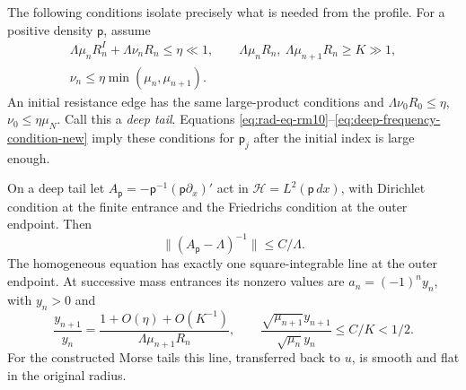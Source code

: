 The following conditions isolate precisely what is needed from the
profile.  For a positive density $\mathsf p$, assume
\begin{equation}\label{eq:rad-eq-dg1}
 \begin{gathered}
 \Lambda\mu_nR_n^I+\Lambda\nu_nR_n\le\eta\ll1,\qquad
 \Lambda\mu_nR_n,\ \Lambda\mu_{n+1}R_n\ge K\gg1,\\
 \nu_n\le\eta\min(\mu_n,\mu_{n+1}).
 \end{gathered}
\end{equation}
An initial resistance edge has the same large-product conditions and
$\Lambda\nu_0R_0\le\eta$, $\nu_0\le\eta\mu_N$.
Call this a \emph{deep tail}.  Equations
\eqref{eq:rad-eq-rm10}--\eqref{eq:deep-frequency-condition-new} imply
these conditions for $\mathsf p_j$ after the initial index is large
enough.

\begin{lemma}
\label{lem:radial-deep-inverse}
\label{lem:radial-flat-line}
On a deep tail let
$A_{\mathsf p}=-\mathsf p^{-1}(\mathsf p\partial_x)'$ act in
$\mathcal H=L^2(\mathsf p\,dx)$, with Dirichlet condition at the finite
entrance and the Friedrichs condition at the outer endpoint.  Then
\[
 \|(A_{\mathsf p}-\Lambda)^{-1}\|\le C/\Lambda.
\]
The homogeneous equation has exactly one square-integrable line at
the outer endpoint.  At successive mass entrances its nonzero values
are $a_n=(-1)^ny_n$, with $y_n>0$ and
\begin{equation}\label{eq:rad-eq-dg4}
 \frac{y_{n+1}}{y_n}
 =\frac{1+O(\eta)+O(K^{-1})}{\Lambda\mu_{n+1}R_n},
 \qquad
 \frac{\sqrt{\mu_{n+1}}y_{n+1}}{\sqrt{\mu_n}y_n}\le C/K<1/2.
\end{equation}
For the constructed Morse tails this line, transferred back to $u$,
is smooth and flat in the original radius.
\end{lemma}

